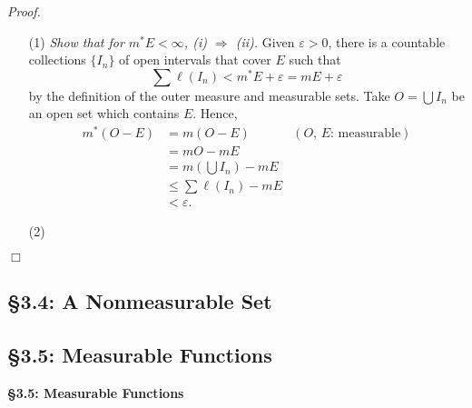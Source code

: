 \documentclass{article}
\begin{document}
\emph{Proof.}
\begin{enumerate}
\item[(1)]
  \emph{Show that for $m^{*}E < \infty$, (i) $\Rightarrow$ (ii).}
  Given $\varepsilon > 0$,
  there is a countable collections $\{ I_n \}$ of open intervals that cover $E$
  such that
  \[
    \sum \ell(I_n) < m^{*}E + \varepsilon = mE + \varepsilon
  \]
  by the definition of the outer measure and measurable sets.
  Take $O = \bigcup I_n$ be an open set which contains $E$.
  Hence,
  \begin{align*}
    m^{*}(O - E)
    &= m(O - E)
      &(\text{$O$, $E$: measurable}) \\
    &= mO - mE \\
    &= m\left( \bigcup I_n \right) - mE \\
    &\leq \sum \ell(I_n) - mE \\
    &< \varepsilon.
  \end{align*}

\item[(2)]

\end{enumerate}
$\Box$\\







\subsection*{\S 3.4: A Nonmeasurable Set \\}






\subsection*{\S 3.5: Measurable Functions \\}

\textbf{\large \S 3.5: Measurable Functions} \\\\
\end{document}
